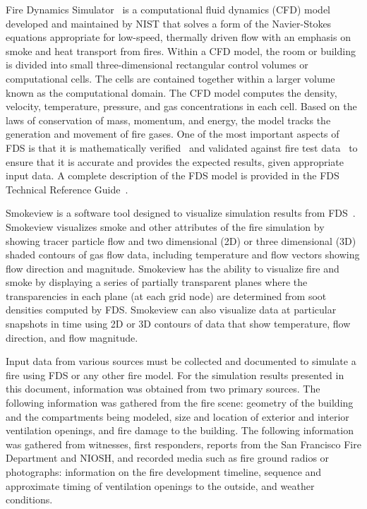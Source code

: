 \documentclass[12pt,oneside]{book}
\begin{document}
Fire Dynamics Simulator~\cite{FDS_Users_Guide} is a computational fluid dynamics (CFD) model developed and maintained by NIST that solves a form of the Navier-Stokes equations appropriate for low-speed, thermally driven flow with an emphasis on smoke and heat transport from fires. Within a CFD model, the room or building is divided into small three-dimensional rectangular control volumes or computational cells. The cells are contained together within a larger volume known as the computational domain. The CFD model computes the density, velocity, temperature, pressure, and gas concentrations in each cell. Based on the laws of conservation of mass, momentum, and energy, the model tracks the generation and movement of fire gases. One of the most important aspects of FDS is that it is mathematically verified~\cite{FDS_Verification_Guide} and validated against fire test data~\cite{FDS_Validation_Guide} to ensure that it is accurate and provides the expected results, given appropriate input data. A complete description of the FDS model is provided in the FDS Technical Reference Guide~\cite{FDS_Math_Guide}.

Smokeview is a software tool designed to visualize simulation results from FDS~\cite{Smokeview_Users_Guide}. Smokeview visualizes smoke and other attributes of the fire simulation by showing tracer particle flow and two dimensional (2D) or three dimensional (3D) shaded contours of gas flow data, including temperature and flow vectors showing flow direction and magnitude. Smokeview has the ability to visualize fire and smoke by displaying a series of partially transparent planes where the transparencies in each plane (at each grid node) are determined from soot densities computed by FDS. Smokeview can also visualize data at particular snapshots in time using 2D or 3D contours of data that show temperature, flow direction, and flow magnitude.

Input data from various sources must be collected and documented to simulate a fire using FDS or any other fire model. For the simulation results presented in this document, information was obtained from two primary sources. The following information was gathered from the fire scene: geometry of the building and the compartments being modeled,  size and location of exterior and interior ventilation openings, and fire damage to the building. The following information was gathered from witnesses, first responders, reports from the San Francisco Fire Department and NIOSH, and recorded media such as fire ground radios or photographs: information on the fire development timeline, sequence and approximate timing of ventilation openings to the outside, and weather conditions.
\end{document}
